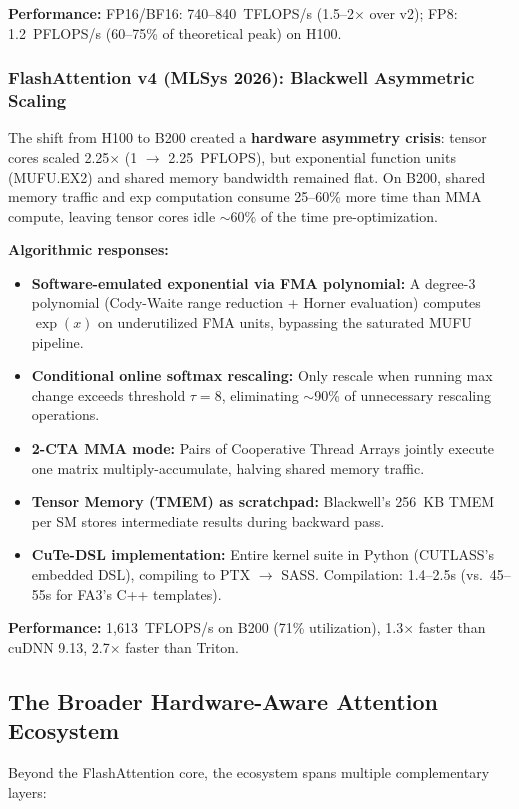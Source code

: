 \documentclass[11pt,a4paper]{article}
\begin{document}
\textbf{Performance:} FP16/BF16: 740--840~TFLOPS/s (1.5--2$\times$ over v2); FP8: 1.2~PFLOPS/s (60--75\% of theoretical peak) on H100.

\subsubsection{FlashAttention v4 (MLSys 2026): Blackwell Asymmetric Scaling}

The shift from H100 to B200 created a \textbf{hardware asymmetry crisis}: tensor cores scaled 2.25$\times$ (1 $\to$ 2.25~PFLOPS), but exponential function units (MUFU.EX2) and shared memory bandwidth remained flat. On B200, shared memory traffic and exp computation consume 25--60\% more time than MMA compute, leaving tensor cores idle $\sim$60\% of the time pre-optimization.

\textbf{Algorithmic responses:}
\begin{itemize}[leftmargin=*]
    \item \textbf{Software-emulated exponential via FMA polynomial:} A degree-3 polynomial (Cody-Waite range reduction + Horner evaluation) computes $\exp(x)$ on underutilized FMA units, bypassing the saturated MUFU pipeline.
    \item \textbf{Conditional online softmax rescaling:} Only rescale when running max change exceeds threshold $\tau = 8$, eliminating $\sim$90\% of unnecessary rescaling operations.
    \item \textbf{2-CTA MMA mode:} Pairs of Cooperative Thread Arrays jointly execute one matrix multiply-accumulate, halving shared memory traffic.
    \item \textbf{Tensor Memory (TMEM) as scratchpad:} Blackwell's 256~KB TMEM per SM stores intermediate results during backward pass.
    \item \textbf{CuTe-DSL implementation:} Entire kernel suite in Python (CUTLASS's embedded DSL), compiling to PTX $\to$ SASS. Compilation: 1.4--2.5s (vs.\ 45--55s for FA3's C++ templates).
\end{itemize}

\textbf{Performance:} 1,613~TFLOPS/s on B200 (71\% utilization), 1.3$\times$ faster than cuDNN 9.13, 2.7$\times$ faster than Triton.

\subsection{The Broader Hardware-Aware Attention Ecosystem}

Beyond the FlashAttention core, the ecosystem spans multiple complementary layers:
\end{document}
